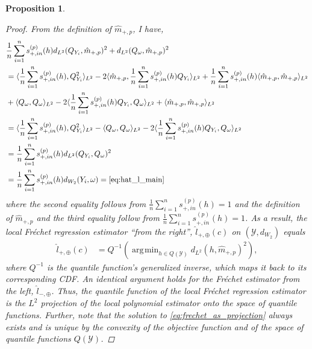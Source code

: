 \documentclass[12pt]{article}
\newtheorem{proposition}{Proposition}
\DeclareMathOperator*{\argmin}{\arg\!\min}
\begin{document}
\begin{proposition}
\begin{proof}
From the definition of $\hat{m}_{+,p}$, I have,
\begin{align*}
 & \frac1n \sum_{i=1}^n  s^{(p)}_{+,in}(h) d_{L^2}(Q_{Y_i}, \hat{m}_{+,p})^2 + d_{L^2}(Q_\omega, \hat{m}_{+,p})^2  \\ 
 & =   \langle \frac1n \sum_{i=1}^n   s^{(p)}_{+,in}(h), Q_{Y_i}^2 \rangle_{L^2} - 2   \langle \hat{m}_{+,p},  \frac1n \sum_{i=1}^n  s^{(p)}_{+,in}(h) Q_{Y_i} \rangle_{L^2} +   \frac1n \sum_{i=1}^n   s^{(p)}_{+,in}(h) \langle \hat{m}_{+,p} , \hat{m}_{+,p} \rangle_{L^2} \\
 & +  
\langle Q_\omega, Q_\omega \rangle_{L^2} -  2 \langle  \frac1n \sum_{i=1}^n   s^{(p)}_{+,in}(h) Q_{Y_i}, Q_\omega \rangle_{L^2} +   \langle \hat{m}_{+,p}, \hat{m}_{+,p} \rangle_{L^2} \\ 
  & =   \langle \frac1n \sum_{i=1}^n   s^{(p)}_{+,in}(h), Q_{Y_i}^2 \rangle_{L^2} -\langle Q_\omega, Q_\omega \rangle_{L^2} -  2 \langle \frac1n  \sum_{i=1}^n s^{(p)}_{+,in}(h) Q_{Y_i}, Q_\omega \rangle_{L^2} \\  
 & =  \frac1n \sum_{i=1}^n   s^{(p)}_{+,in}(h) d_{L^2}(Q_{Y_i}, Q_\omega)^2 \\
 & =  \frac1n \sum_{i=1}^n   s^{(p)}_{+,in}(h) d_{W_2}(Y_i, \omega)  = \eqref{eq:hat_l_main}
\end{align*}
where the second equality follows from  $ \frac1n \sum_{i=1}^n   s^{(p)}_{+,in}(h) = 1$ and the definition of $\hat{m}_{+,p}$ and the third equality follow from $ \frac1n \sum_{i=1}^n   s^{(p)}_{+,in}(h) = 1$. 
As a result, the local Fr\'echet regression estimator ``from the right'', $\hat{l}_{+,\oplus}(c)$ on $(\mathcal{Y}, d_{W_2})$ equals
\begin{align} \label{eq:frechet_as_projection}
\hat{l}_{+,\oplus}(c) & = Q^{-1} \left( \argmin_{h \in Q(\mathcal{Y})} d_{L^2}(h, \hat{m}_{+,p})^2  \right),
\end{align}
where $Q^{-1}$ is the quantile function’s generalized inverse, which maps it back to its corresponding CDF. An identical argument holds for the Fr\'echet estimator from the left, $\hat{l}_{-, \oplus}$. Thus, the quantile function of the local Fr\'echet regression estimator is the $L^2$ projection of the local polynomial estimator onto the space of quantile functions. Further, note that the solution to \eqref{eq:frechet_as_projection} always exists and is unique by the convexity of the objective function and of the space of quantile functions $Q(\mathcal{Y})$.


\end{proof}
\end{proposition}
\end{document}
